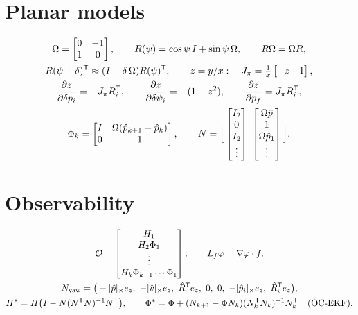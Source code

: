 \section*{Planar models}
\begin{gather*}
  \Omega = \begin{bmatrix} 0 & -1 \\ 1 & 0\end{bmatrix}, \qquad R(\psi) = \cos\psi\,I + \sin\psi\,\Omega, \qquad R\Omega = \Omega R, \\
  R(\psi + \delta)\T \approx (I - \delta\,\Omega)R(\psi)\T, \qquad z = y/x: \quad J_\pi = \tfrac1x\begin{bmatrix} -z & 1\end{bmatrix}, \\
  \frac{\partial z}{\partial\delta p_i} = -J_\pi R_i\T, \qquad
  \frac{\partial z}{\partial\delta\psi_i} = -(1 + z^2), \qquad \frac{\partial z}{\partial p_f} = J_\pi R_i\T, \\
  \Phi_k = \begin{bmatrix} I & \Omega(\hat p_{k+1} - \hat p_k) \\ 0 & 1\end{bmatrix}, \qquad
  N = \Big[\begin{bmatrix} I_2 \\ 0 \\ I_2 \\ \vdots\end{bmatrix}\ \begin{bmatrix} \Omega\hat p \\ 1 \\ \Omega\hat p_1 \\ \vdots\end{bmatrix}\Big].
\end{gather*}

\section*{Observability}
\begin{gather*}
  \mathcal{O} = \begin{bmatrix} H_1 \\ H_2\Phi_1 \\ \vdots \\ H_k\Phi_{k-1}\cdots\Phi_1\end{bmatrix}, \qquad
  L_f\varphi = \nabla\varphi\cdot f, \\
  N_{\text{yaw}} = \big(-[\hat p]_{\times}e_z,\ -[\hat v]_{\times}e_z,\ \hat R^{\mathsf{T}} e_z,\ 0,\ 0,\ -[\hat p_i]_{\times}e_z,\ \hat R_i^{\mathsf{T}} e_z\big), \\
  H^* = H\big(I - N(N^{\mathsf{T}} N)^{-1} N^{\mathsf{T}}\big), \qquad \Phi^* = \Phi + (N_{k+1} - \Phi N_k)(N_k^{\mathsf{T}} N_k)^{-1} N_k^{\mathsf{T}} \quad \text{(OC-EKF)} .
\end{gather*}
